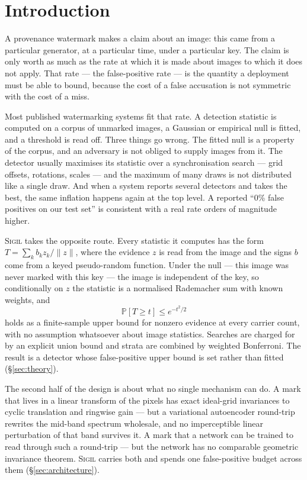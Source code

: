 \documentclass[10pt,twocolumn]{article}
\theoremstyle{definition}
\theoremstyle{remark}
\renewcommand{\Pr}{\mathbb{P}}
\newcommand{\sigil}{\textsc{Sigil}}
\begin{document}
\section{Introduction}

A provenance watermark makes a claim about an image: this came from a particular
generator, at a particular time, under a particular key. The claim is only worth
as much as the rate at which it is made about images to which it does not apply.
That rate --- the false-positive rate --- is the quantity a deployment must be
able to bound, because the cost of a false accusation is not symmetric with the
cost of a miss.

Most published watermarking systems fit that rate. A detection statistic is
computed on a corpus of unmarked images, a Gaussian or empirical null is fitted,
and a threshold is read off. Three things go wrong. The fitted null is a property
of the corpus, and an adversary is not obliged to supply images from it. The
detector usually maximises its statistic over a synchronisation search --- grid
offsets, rotations, scales --- and the maximum of many draws is not distributed
like a single draw. And when a system reports several detectors and takes the
best, the same inflation happens again at the top level. A reported ``0\% false
positives on our test set'' is consistent with a real rate orders of magnitude
higher.

\sigil{} takes the opposite route. Every statistic it computes has the form
$T=\sum_k b_k z_k / \lVert z\rVert$, where the evidence $z$ is read from the
image and the signs $b$ come from a keyed pseudo-random function. Under the null
--- this image was never marked with this key --- the image is independent of the
key, so conditionally on $z$ the statistic is a normalised Rademacher sum with
known weights, and
\[
  \Pr\!\left[T \geq t\right] \leq e^{-t^{2}/2}
\]
holds as a finite-sample upper bound for nonzero evidence at every carrier count, with no
assumption whatsoever about image statistics. Searches are charged for by an
explicit union bound and strata are combined by weighted Bonferroni. The result
is a detector whose false-positive upper bound is set rather than fitted
(\S\ref{sec:theory}).

The second half of the design is about what no single mechanism can do. A mark
that lives in a linear transform of the pixels has exact ideal-grid invariances
to cyclic translation and ringwise gain --- but a
variational autoencoder round-trip rewrites the mid-band spectrum wholesale, and
no imperceptible linear perturbation of that band survives it. A mark that a
network can be trained to read through such a round-trip --- but the
network has no comparable geometric invariance theorem. \sigil{}
carries both and spends one false-positive budget across them
(\S\ref{sec:architecture}).
\end{document}
